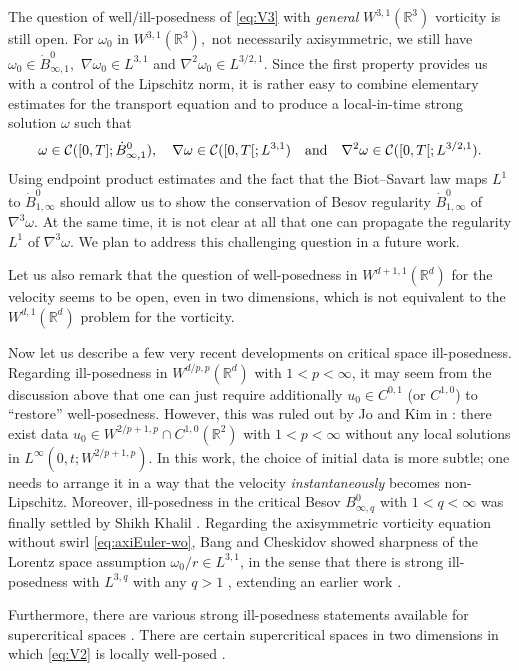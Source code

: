 \documentclass[11pt]{amsart}
\newcommand{\R}{{\mathbb R}}
\def\cC{{\mathcal C}}
\numberwithin{equation}{section}
\newcommand{\andf}{\quad\hbox{and}\quad}
\newcommand{\omg}{\omega}
\def\bbR{\mathbb{R}}
\begin{document}
The question of well/ill-posedness of \eqref{eq:V3} with \textit{general} $W^{3,1}(\bbR^3)$ vorticity is still open. For  $\omega_0$ in $W^{3,1}(\R^3),$ not necessarily axisymmetric, we still have $\omega_0\in\dot B^0_{\infty,1},$
$\nabla\omega_0\in L^{3,1}$ and $\nabla^2\omega_0\in L^{3/2,1}.$ 
Since the first property provides us with a control of the Lipschitz norm, it is rather easy to combine elementary 
estimates for the transport equation and to produce a local-in-time strong solution $\omega$ such that 
$$\omega\in\cC([0,T];\dot B^0_{\infty,1}),\quad \nabla\omega\in \cC([0,T[;L^{3,1})\andf 
\nabla^2\omega\in \cC([0,T[;L^{3/2,1}).$$
Using endpoint product estimates and the fact that the Biot--Savart law maps 
$L^1$ to $\dot B^0_{1,\infty}$ should  allow us to show the conservation of Besov regularity $\dot B^0_{1,\infty}$ of $\nabla^3\omega.$
At the same time, it is not clear at all that one can propagate the regularity $L^1$ of  $\nabla^3\omega.$
We plan to address this challenging  question in a future work. 

Let us also remark that the question of well-posedness in $W^{d+1,1}(\bbR^d)$ for the velocity seems to be open, even in two dimensions, which is not equivalent to the $W^{d,1}(\R^d)$ problem for the vorticity.

Now let us describe a few very recent developments on critical space ill-posedness.  Regarding ill-posedness in $W^{d/p,p}(\R^d)$ with $1<p<\infty$, it may seem from the discussion above that one can just require additionally $u_{0} \in C^{0,1}$ (or $C^{1,0}$) to ``restore'' well-posedness. However, this was ruled out by Jo and Kim in \cite{JoK}: there exist data $u_{0} \in W^{2/p+1,p} \cap C^{1,0}(\bbR^2)$ with $1<p<\infty$ without any local solutions in $L^{\infty}(0,t;W^{2/p+1,p})$. In this work, the choice of initial data is more subtle; one needs to arrange it in a way that the velocity \textit{instantaneously} becomes non-Lipschitz. Moreover, ill-posedness in the critical Besov $B^{0}_{\infty,q} $ with $1<q<\infty$ was finally settled by Shikh Khalil \cite{SK}. Regarding the axisymmetric vorticity equation without swirl \eqref{eq:axiEuler-wo}, Bang and Cheskidov showed sharpness of the Lorentz space assumption $\omg_{0}/r \in L^{3,1}$, in the sense that there is strong ill-posedness with $L^{3,q}$ with any $q> 1$ \cite{BC}, extending an earlier work \cite{JK}.

Furthermore, there are various strong ill-posedness statements available for supercritical spaces \cite{BT, CMO,Luo,Jeong,JMO}. There are certain supercritical spaces in two dimensions in which \eqref{eq:V2} is locally well-posed \cite{EMS}.
\end{document}
